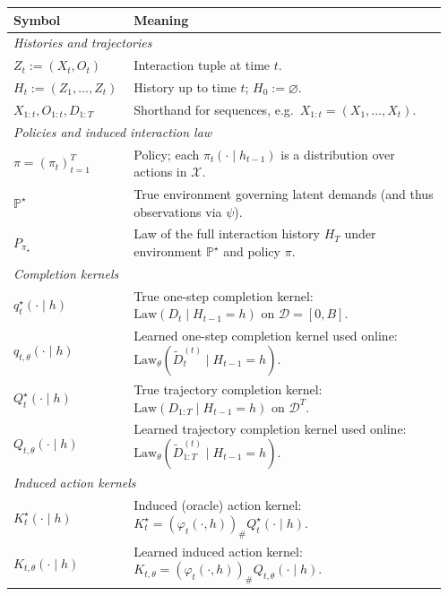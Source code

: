 \documentclass[11pt]{article}
\renewcommand{\arraystretch}{1.15}
\renewcommand{\P}{\mathbb{P}}
\renewcommand{\arraystretch}{0.88}
\begin{document}
\begin{table}[t]
\ContinuedFloat
\centering
\small
\setlength{\tabcolsep}{6pt}
\renewcommand{\arraystretch}{1.15}
\begin{tabular}{p{0.26\linewidth} p{0.70\linewidth}}
\toprule
\textbf{Symbol} & \textbf{Meaning}\\

\midrule
\multicolumn{2}{l}{\textit{Histories and trajectories}}\\
$Z_t:=(X_t,O_t)$ & Interaction tuple at time $t$.\\
$H_t:=(Z_1,\dots,Z_t)$ & History up to time $t$; $H_0:=\varnothing$.\\
$X_{1:t},O_{1:t},D_{1:T}$ & Shorthand for sequences, e.g.\ $X_{1:t}=(X_1,\dots,X_t)$.\\

\midrule
\multicolumn{2}{l}{\textit{Policies and induced interaction law}}\\
$\pi=(\pi_t)_{t=1}^T$ & Policy; each $\pi_t(\cdot\mid h_{t-1})$ is a distribution over actions in $\mathcal{X}$.\\
$\P^\star$ & True environment governing latent demands (and thus observations via $\psi$).\\
$P_{\pi_\star}$ & Law of the full interaction history $H_T$ under environment $\P^\star$ and policy $\pi$.\\

\midrule
\multicolumn{2}{l}{\textit{Completion kernels}}\\
$q_t^\star(\cdot\mid h)$ & True one-step completion kernel: $\mathrm{Law}( D_t\mid H_{t-1}=h)$ on $\mathcal{D}=[0,B]$.\\
$q_{t,\theta}(\cdot\mid h)$ & Learned one-step completion kernel used online: $\mathrm{Law}_\theta(\widetilde D_t^{(t)}\mid H_{t-1}=h)$.\\
$Q_t^\star(\cdot\mid h)$ & True trajectory completion kernel: $\mathrm{Law}( D_{1:T}\mid H_{t-1}=h)$ on $\mathcal{D}^T$.\\
$Q_{t,\theta}(\cdot\mid h)$ & Learned trajectory completion kernel used online: $\mathrm{Law}_\theta(\widetilde D_{1:T}^{(t)}\mid H_{t-1}=h)$.\\

\midrule
\multicolumn{2}{l}{\textit{Induced action kernels}}\\
$K_t^\star(\cdot\mid h)$ & Induced (oracle) action kernel: $K_t^\star=(\varphi_t(\cdot,h))_{\#}Q_t^\star(\cdot\mid h)$.\\
$K_{t,\theta}(\cdot\mid h)$ & Learned induced action kernel: $K_{t,\theta}=(\varphi_t(\cdot,h))_{\#}Q_{t,\theta}(\cdot\mid h)$.\\


\end{tabular}
\end{table}
\end{document}
